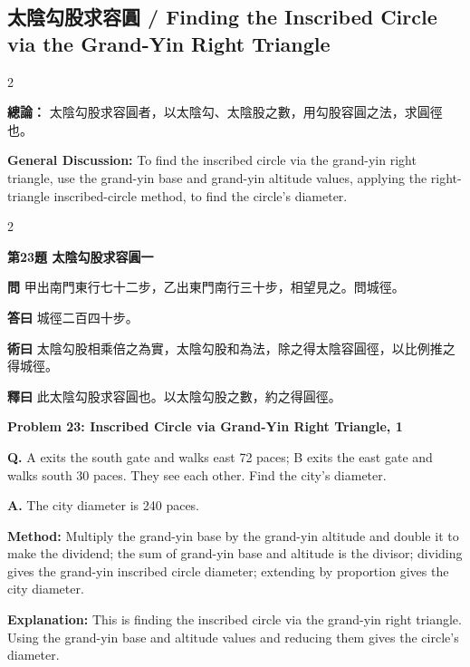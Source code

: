 \documentclass[11pt,a4paper]{article}
\newcommand{\wen}[1]{\noindent\textbf{問} #1\par\smallskip}
\newcommand{\da}[1]{\noindent\textbf{答曰} #1\par\smallskip}
\newcommand{\shu}[1]{\noindent\textbf{術曰} #1\par\smallskip}
\newcommand{\shi}[1]{\noindent\textbf{釋曰} #1\par\smallskip}
\newcommand{\wenE}[1]{\noindent\textbf{Q.} #1\par\smallskip}
\newcommand{\daE}[1]{\noindent\textbf{A.} #1\par\smallskip}
\newcommand{\shuE}[1]{\noindent\textbf{Method:} #1\par\smallskip}
\newcommand{\shiE}[1]{\noindent\textbf{Explanation:} #1\par\smallskip}
\begin{document}
\clearpage

\subsection*{太陰勾股求容圓 / Finding the Inscribed Circle via the Grand-Yin Right Triangle}

\begin{paracol}{2}

\noindent\textbf{總論：} 太陰勾股求容圓者，以太陰勾、太陰股之數，用勾股容圓之法，求圓徑也。

\switchcolumn

\noindent\textbf{General Discussion:} To find the inscribed circle via the grand-yin right triangle, use the grand-yin base and grand-yin altitude values, applying the right-triangle inscribed-circle method, to find the circle's diameter.

\end{paracol}

\bigskip

\begin{paracol}{2}

\noindent\textbf{第23題 太陰勾股求容圓一}

\wen{甲出南門東行七十二步，乙出東門南行三十步，相望見之。問城徑。}
\da{城徑二百四十步。}
\shu{太陰勾股相乘倍之為實，太陰勾股和為法，除之得太陰容圓徑，以比例推之得城徑。}
\shi{此太陰勾股求容圓也。以太陰勾股之數，約之得圓徑。}

\switchcolumn

\noindent\textbf{Problem 23: Inscribed Circle via Grand-Yin Right Triangle, 1}

\wenE{A exits the south gate and walks east 72 paces; B exits the east gate and walks south 30 paces. They see each other. Find the city's diameter.}
\daE{The city diameter is 240 paces.}
\shuE{Multiply the grand-yin base by the grand-yin altitude and double it to make the dividend; the sum of grand-yin base and altitude is the divisor; dividing gives the grand-yin inscribed circle diameter; extending by proportion gives the city diameter.}
\shiE{This is finding the inscribed circle via the grand-yin right triangle. Using the grand-yin base and altitude values and reducing them gives the circle's diameter.}

\end{paracol}
\end{document}

